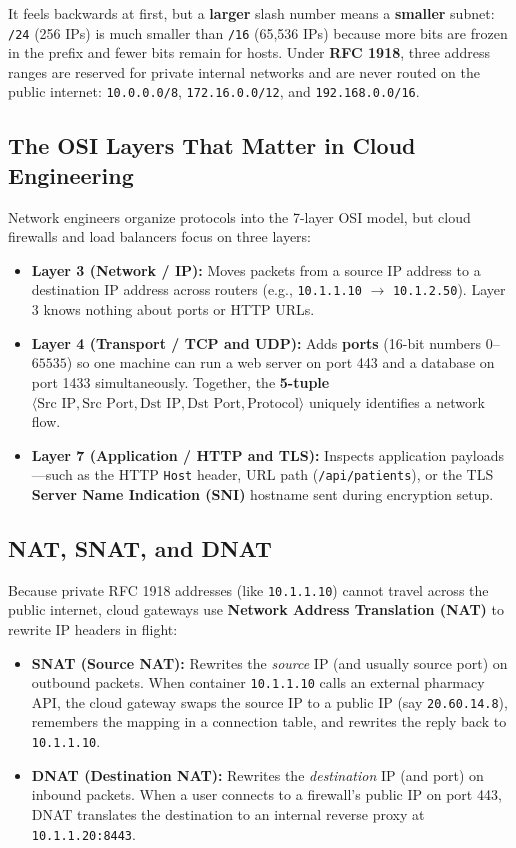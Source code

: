 \begin{intuitionbox}
It feels backwards at first, but a \textbf{larger} slash number means a \textbf{smaller} subnet: \texttt{/24} (256 IPs) is much smaller than \texttt{/16} (65,536 IPs) because more bits are frozen in the prefix and fewer bits remain for hosts. Under \textbf{RFC 1918}, three address ranges are reserved for private internal networks and are never routed on the public internet: \texttt{10.0.0.0/8}, \texttt{172.16.0.0/12}, and \texttt{192.168.0.0/16}.
\end{intuitionbox}

\subsection{The OSI Layers That Matter in Cloud Engineering}
Network engineers organize protocols into the 7-layer OSI model, but cloud firewalls and load balancers focus on three layers:
\begin{itemize}[leftmargin=12pt]
  \item \textbf{Layer 3 (Network / IP):} Moves packets from a source IP address to a destination IP address across routers (e.g., \texttt{10.1.1.10} $\to$ \texttt{10.1.2.50}). Layer 3 knows nothing about ports or HTTP URLs.
  \item \textbf{Layer 4 (Transport / TCP and UDP):} Adds \textbf{ports} (16-bit numbers $0$--$65535$) so one machine can run a web server on port 443 and a database on port 1433 simultaneously. Together, the \textbf{5-tuple} $\langle \text{Src IP}, \text{Src Port}, \text{Dst IP}, \text{Dst Port}, \text{Protocol} \rangle$ uniquely identifies a network flow.
  \item \textbf{Layer 7 (Application / HTTP and TLS):} Inspects application payloads—such as the HTTP \texttt{Host} header, URL path (\texttt{/api/patients}), or the TLS \textbf{Server Name Indication (SNI)} hostname sent during encryption setup.
\end{itemize}

\subsection{NAT, SNAT, and DNAT}
Because private RFC 1918 addresses (like \texttt{10.1.1.10}) cannot travel across the public internet, cloud gateways use \textbf{Network Address Translation (NAT)} to rewrite IP headers in flight:
\begin{itemize}[leftmargin=12pt]
  \item \textbf{SNAT (Source NAT):} Rewrites the \emph{source} IP (and usually source port) on outbound packets. When container \texttt{10.1.1.10} calls an external pharmacy API, the cloud gateway swaps the source IP to a public IP (say \texttt{20.60.14.8}), remembers the mapping in a connection table, and rewrites the reply back to \texttt{10.1.1.10}.
  \item \textbf{DNAT (Destination NAT):} Rewrites the \emph{destination} IP (and port) on inbound packets. When a user connects to a firewall's public IP on port 443, DNAT translates the destination to an internal reverse proxy at \texttt{10.1.1.20:8443}.
\end{itemize}

